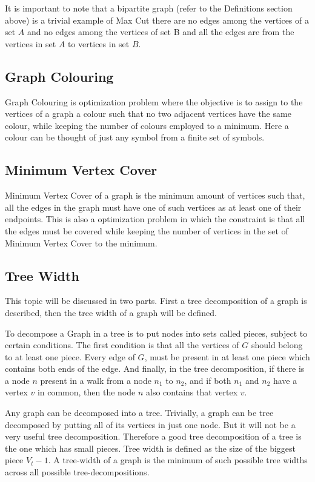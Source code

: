 It is important to note that a bipartite graph (refer to the Definitions
section above) is a trivial example of Max Cut there are no edges among the
vertices of a set $A$ and no edges among the vertices of set B and all the edges
are from the vertices in set $A$ to vertices in set $B$.

\subsection{Graph Colouring}
Graph Colouring is optimization problem where the objective is to assign to the vertices
of a graph a colour such that no two adjacent vertices have the same colour,
while keeping the number of colours employed to a minimum. Here a colour can be
thought of just any symbol from a finite set of symbols.

\subsection{Minimum Vertex Cover}
Minimum Vertex Cover of a graph is the minimum amount of vertices such that,
all the edges in the graph must have one of such vertices as at least one of
their endpoints. This is also a optimization problem in which the constraint is
that all the edges must be covered while keeping the number of vertices in the
set of Minimum Vertex Cover to the minimum.

\subsection{Tree Width}
\label{explanation: treewidth}
This topic will be discussed in two parts. First a tree decomposition of a
graph is described, then the tree width of a graph will be defined.

To decompose a Graph in a tree is to put nodes into sets called pieces, subject
to certain conditions.  The first condition is that all the vertices of $G$
should belong to at least one piece. Every edge of $G$, must be present in
at least one piece which contains both ends of the edge.  And finally, in the
tree decomposition, if there is a node $n$ present in a walk from a node $n_1$
to $n_2$, and if both $n_1$ and $n_2$ have a vertex $v$ in common, then the node
$n$ also contains that vertex $v$. 

Any graph can be decomposed into a tree. Trivially, a graph can be tree
decomposed by putting all of its vertices in just one node. But it will not be
a very useful tree decomposition.  Therefore a good tree decomposition of a
tree is the one which has small pieces.  Tree width is defined as the size of
the biggest piece $V_t - 1$. A tree-width of a graph is the minimum of such
possible tree widths across all possible tree-decompositions. \cite{KleinbergTardos06}


